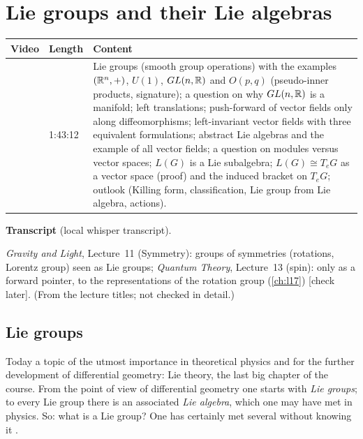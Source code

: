 \chapter{Lie groups and their Lie algebras}\label{ch:l13}
\begin{paracol}{2}

\begin{sources}
\begin{tabularx}{\linewidth}{@{}l l L@{}}
\toprule
\textbf{Video} & \textbf{Length} & \textbf{Content}\\
\midrule
{} & 1:43:12 & Lie groups (smooth group operations) with the examples $(\mathbb{R}^n,+)$, $U(1)$, $GL(n,\mathbb{R})$ and $O(p,q)$ (pseudo-inner products, signature); a question on why $GL(n,\mathbb{R})$ is a manifold; left translations; push-forward of vector fields only along diffeomorphisms; left-invariant vector fields with three equivalent formulations; abstract Lie algebras and the example of all vector fields; a question on modules versus vector spaces; $L(G)$ is a Lie subalgebra; $L(G)\cong T_eG$ as a vector space (proof) and the induced bracket on $T_eG$; outlook (Killing form, classification, Lie group from Lie algebra, actions).\\
\bottomrule
\end{tabularx}

\smallskip
\textbf{Transcript}  (local whisper transcript).
\end{sources}

\begin{reading}
\emph{Gravity and Light}, Lecture~11 (Symmetry): groups of symmetries (rotations, Lorentz group) seen as Lie groups; \emph{Quantum Theory}, Lecture~13 (spin): only as a forward pointer, to the representations of the rotation group (\cref{ch:l17}) [check later]. (From the lecture titles; not checked in detail.)
\end{reading}

\section{Lie groups}\label{sec:ll-groups}

Today a topic of the utmost importance in theoretical physics and for the further development of differential geometry: Lie theory, the last big chapter of the course. From the point of view of differential geometry one starts with \emph{Lie groups}; to every Lie group there is an associated \emph{Lie algebra}, which one may have met in physics. So: what is a Lie group? One has certainly met several without knowing it
 .


\end{paracol}
